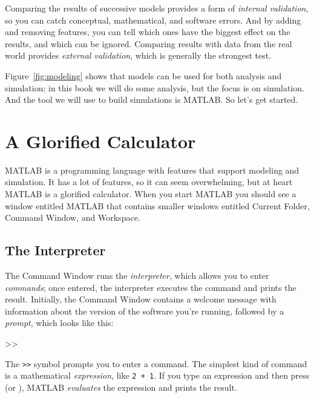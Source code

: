 \documentclass[../../book.tex]{subfiles}
\begin{document}

Comparing the results of successive models provides a form of \emph{internal  validation}, so you can catch conceptual, mathematical, and software errors.  And by adding and removing features, you can tell which ones have the biggest effect on the results, and which can be ignored.
%
%
%
%
Comparing results with data from the real world provides \emph{external validation}, which is generally the strongest test.

Figure~\ref{fig:modeling} shows that models can be used for both analysis and simulation; in this book we will do some analysis, but the focus is on simulation.  And the tool we will use to build simulations is MATLAB.  So let's get started.


\section{A Glorified Calculator}
\label{calc}

MATLAB is a programming language with features that support modeling and simulation.  It has a lot of features, so it can seem overwhelming, but at heart MATLAB is a glorified calculator.  When you start MATLAB you should see a window entitled MATLAB that contains smaller windows entitled Current Folder, Command Window, and Workspace.


\subsection{The Interpreter}
The Command Window runs the \emph{interpreter}, which allows you
to enter \emph{commands}; once entered, the interpreter executes the command and prints the
result.
Initially, the Command Window contains a welcome message with information
about the version of the software you're running, followed by a \emph{prompt}, which looks like this:

\begin{code}
>>
\end{code}

The \lstinline{>>} symbol prompts you to enter a command.
The simplest kind of command is a mathematical \emph{expression},
like \lstinline{2 + 1}.
If you type an expression and then press  (or ), MATLAB
\emph{evaluates} the expression and prints the result.
\end{document}
